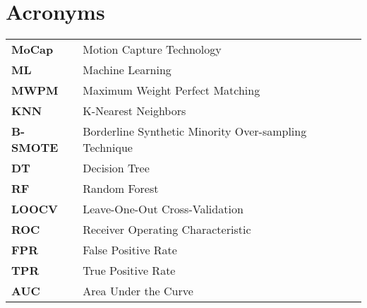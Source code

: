 \section*{\Huge Acronyms}

\begin{table}[H]
    \begin{tabular}{l l} 
        \textbf{MoCap} & Motion Capture Technology \\
        \textbf{ML} & Machine Learning \\
        \textbf{MWPM} & Maximum Weight Perfect Matching \\
        \textbf{KNN} & K-Nearest Neighbors \\
        \textbf{B-SMOTE} & Borderline Synthetic Minority Over-sampling Technique \\
        \textbf{DT} & Decision Tree \\
        \textbf{RF} & Random Forest \\
        \textbf{LOOCV} & Leave-One-Out Cross-Validation \\
        \textbf{ROC} & Receiver Operating Characteristic \\
        \textbf{FPR} & False Positive Rate \\
        \textbf{TPR} & True Positive Rate \\
        \textbf{AUC} & Area Under the Curve \\
    \end{tabular}
\end{table}
